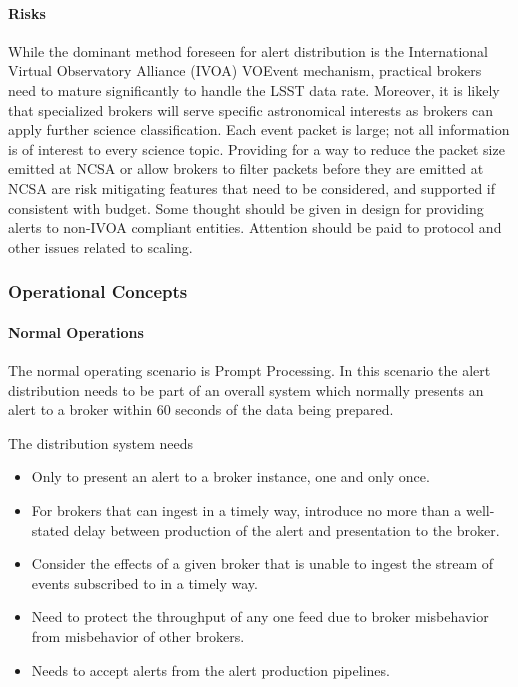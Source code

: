 \paragraph{Risks}
While the dominant method foreseen for alert distribution is the International Virtual Observatory Alliance (IVOA) VOEvent mechanism, practical brokers need to mature significantly to handle the LSST data rate. Moreover, it is likely that specialized brokers will serve specific astronomical interests as brokers can apply further science classification. Each event packet is large; not all information is of interest to every science topic. Providing for a way to reduce the packet size emitted at NCSA or allow brokers to filter packets before they are emitted at NCSA are risk mitigating features that need to be considered, and supported if consistent with budget. Some thought should be given in design for providing alerts to non-IVOA compliant entities. Attention should be paid to protocol and other issues related to scaling.

\subsubsection{Operational Concepts}

\paragraph{Normal Operations}
The normal operating scenario is Prompt Processing. In this scenario the alert distribution needs to be part of an overall system which normally presents an alert to a broker within 60 seconds of the data being prepared. 

The distribution system needs

\begin{itemize}

\item Only to present an alert to a broker instance, one and only once.

\item For brokers that can ingest in a timely way, introduce no more than a well-stated delay between production of the alert and presentation to the broker.  

\item Consider the effects of a given broker that is unable to ingest the stream of events subscribed to in a timely way.

\item Need to protect the throughput of any one feed due to broker misbehavior from misbehavior of other brokers.

\item Needs to accept alerts from the alert production pipelines.

\end{itemize}

